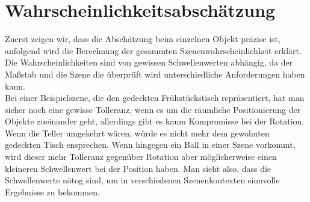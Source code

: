 \section{Wahrscheinlichkeitsabschätzung}
Zuerst zeigen wir, dass die Abschätzung beim einzelnen Objekt präzise ist, anfolgend wird die Berechnung der gesammten Szenenwahrscheinlichkeit erklärt. Die Wahrscheinlichkeiten sind von gewissen Schwellenwerten abhängig, da der Maßstab und die Szene die überprüft wird unterschiedliche Anforderungen haben kann. \smallskip\\
Bei einer Beispielszene, die den gedeckten Frühstückstisch repräsentiert, hat man sicher noch eine gewisse Tolleranz, wenn es um die räumliche Positionierung der Objekte zueinander geht, allerdings gibt es kaum Kompromisse bei der Rotation. Wenn die Teller umgekehrt wären, würde es nicht mehr dem gewohnten gedeckten Tisch ensprechen. Wenn hingegen ein Ball in einer Szene vorkommt, wird dieser mehr Tolleranz gegenüber Rotation aber möglicherweise einen kleineren Schwellenwert bei der Position haben. Man sieht also, dass die Schwellenwerte nötog sind, um in verschiedenen Szenenkontexten sinnvolle Ergebnisse zu bekommen.
